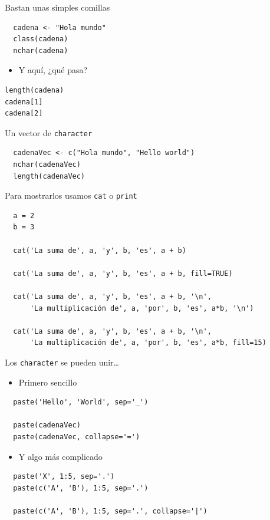 \documentclass[xcolor={usenames,svgnames,dvipsnames}]{beamer}
\begin{document}
\begin{frame}[fragile,label=sec-5-3-1]{Bastan unas simples comillas}
 \lstset{language=R,label= ,caption= ,numbers=none}
\begin{lstlisting}
  cadena <- "Hola mundo"
  class(cadena)
  nchar(cadena)
\end{lstlisting}

\begin{itemize}
\item Y aquí, ¿qué pasa?
\end{itemize}
\lstset{language=R,label= ,caption= ,numbers=none}
\begin{lstlisting}
length(cadena)
cadena[1]
cadena[2]
\end{lstlisting}
\end{frame}

\begin{frame}[fragile,label=sec-5-3-2]{Un vector de \texttt{character}}
 \lstset{language=R,label= ,caption= ,numbers=none}
\begin{lstlisting}
  cadenaVec <- c("Hola mundo", "Hello world")
  nchar(cadenaVec)
  length(cadenaVec)
\end{lstlisting}
\end{frame}

\begin{frame}[fragile,label=sec-5-3-3]{Para mostrarlos usamos \texttt{cat} o \texttt{print}}
 \lstset{language=R,label= ,caption= ,numbers=none}
\begin{lstlisting}
  a = 2
  b = 3
  
  cat('La suma de', a, 'y', b, 'es', a + b)
  
  cat('La suma de', a, 'y', b, 'es', a + b, fill=TRUE)
  
  cat('La suma de', a, 'y', b, 'es', a + b, '\n',
      'La multiplicación de', a, 'por', b, 'es', a*b, '\n')
  
  cat('La suma de', a, 'y', b, 'es', a + b, '\n',
      'La multiplicación de', a, 'por', b, 'es', a*b, fill=15)
\end{lstlisting}
\end{frame}

\begin{frame}[fragile,label=sec-5-3-4]{Los \texttt{character} se pueden unir\ldots{}}
 \begin{itemize}
\item Primero sencillo
\end{itemize}
\lstset{language=R,label= ,caption= ,numbers=none}
\begin{lstlisting}
  paste('Hello', 'World', sep='_')
  
  paste(cadenaVec)
  paste(cadenaVec, collapse='=')
\end{lstlisting}
\begin{itemize}
\item Y algo más complicado
\end{itemize}
\lstset{language=R,label= ,caption= ,numbers=none}
\begin{lstlisting}
  paste('X', 1:5, sep='.')
  paste(c('A', 'B'), 1:5, sep='.')
  
  paste(c('A', 'B'), 1:5, sep='.', collapse='|')
\end{lstlisting}
\end{frame}
\end{document}
